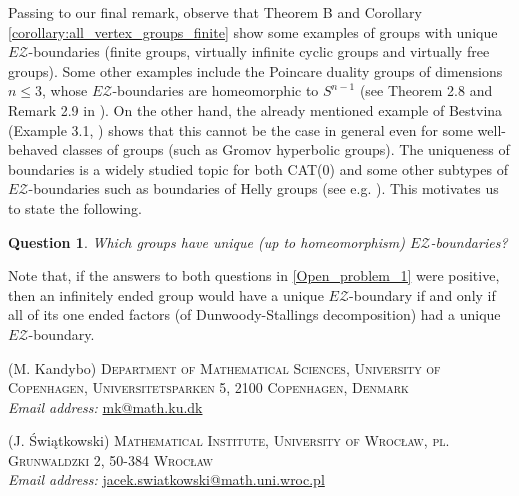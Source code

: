 \documentclass[12pt, a4paper]{article}
\newcommand{\8}{\infty}
\theoremstyle{break}
\newtheorem{oprob}[thm]{Question}
\theoremstyle{defbreak}
\begin{document}
Passing to our final remark, observe that Theorem B and Corollary \ref{corollary:all_vertex_groups_finite} show some examples of groups with unique $E\mathcal{Z}$-boundaries (finite groups, virtually infinite cyclic groups and virtually free groups). Some other examples 
include the Poincare duality groups of dimensions $n\leqslant3$,
whose $E\mathcal{Z}$-boundaries are homeomorphic to $S^{n-1}$ (see Theorem 2.8 and Remark 2.9 in \cite{bestvina}). On the other hand, the already mentioned example of Bestvina (Example 3.1, \cite{bestvina}) shows that this cannot be the case in general even for some well-behaved classes of groups (such as Gromov hyperbolic groups). The uniqueness of boundaries is a  widely studied topic for both CAT(0) and some other subtypes of $E\mathcal{Z}$-boundaries such as boundaries of Helly groups (see e.g. \cite{crooke-kleiner, Ruane, Schreve-Stark, Danielski}). This motivates us to state the following.\medskip

\begin{oprob}
    Which groups have unique (up to homeomorphism) $E\mathcal{Z}$-boundaries?
\end{oprob}

Note that, if the answers to both questions in \ref{Open_problem_1} were positive, then an infinitely ended group 
would have a unique $E\mathcal{Z}$-boundary if and only if all of its one ended factors (of Dunwoody-Stallings decomposition) had a unique $E\mathcal{Z}$-boundary. 




\vfill

\indent (M. Kandybo) \textsc{Department\hspace{0.2cm} of Mathematical Sciences, University of Copenhagen, Universitetsparken 5, 2100 Copenhagen, Denmark}\\
\textit{Email address:} \href{mailto:mk@math.ku.dk}{mk@math.ku.dk}

(J. Świątkowski) \textsc{Mathematical Institute, University of Wrocław, pl. Grunwaldzki 2, \mbox{50-384} Wrocław}\\
\textit{Email address:} \href{mailto:jacek.swiatkowski@math.uni.wroc.pl}{jacek.swiatkowski@math.uni.wroc.pl}
\end{document}
